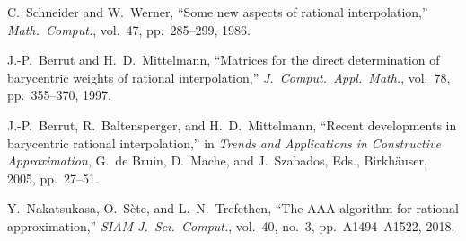 \documentclass{article}
\begin{document}
\begin{thebibliography}{9}
C.~Schneider and W.~Werner, ``Some new aspects of rational interpolation,'' {\em Math.\ Comput.}, vol.\ 47, pp.\ 285--299, 1986.

J.-P.~Berrut and H.~D.~Mittelmann, ``Matrices for the direct determination of barycentric weights of rational interpolation,'' {\em J.\ Comput.\ Appl.\ Math.}, vol.\ 78, pp.\ 355--370, 1997.

J.-P.~Berrut, R.~Baltensperger, and H.~D.~Mittelmann, ``Recent developments in barycentric rational interpolation,'' in {\em Trends and Applications in Constructive Approximation}, G.~de Bruin, D.~Mache, and J.~Szabados, Eds., Birkh\"auser, 2005, pp.\ 27--51.

Y.~Nakatsukasa, O.~S\`ete, and L.~N.~Trefethen, ``The AAA algorithm for rational approximation,'' {\em SIAM J.\ Sci.\ Comput.}, vol.\ 40, no.\ 3, pp.\ A1494--A1522, 2018.
\end{thebibliography}
\end{document}
